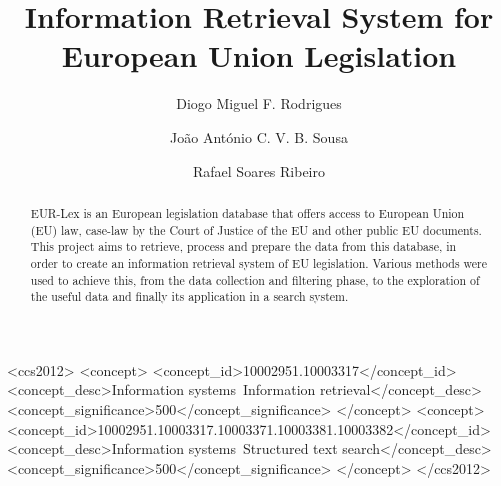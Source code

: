 \documentclass[sigconf, authorversion]{acmart}
\begin{document}
\title{Information Retrieval System for European Union Legislation}

\author{Diogo Miguel F. Rodrigues}

\author{João António C. V. B. Sousa}

\author{Rafael Soares Ribeiro}

\renewcommand{\shortauthors}{Rodrigues, Sousa and Ribeiro}

\begin{abstract}
    EUR-Lex is an European legislation database that offers access to European Union (EU) law,
    case-law by the Court of Justice of the EU and other public EU documents.
    This project aims to retrieve, process and prepare the data from this database, in order to create an information retrieval system of EU legislation.
    Various methods were used to achieve this, from the data collection and filtering phase, to the exploration of the useful data and finally its application in a search system.
\end{abstract}

\begin{CCSXML}
<ccs2012>
<concept>
<concept_id>10002951.10003317</concept_id>
<concept_desc>Information systems~Information retrieval</concept_desc>
<concept_significance>500</concept_significance>
</concept>
<concept>
<concept_id>10002951.10003317.10003371.10003381.10003382</concept_id>
<concept_desc>Information systems~Structured text search</concept_desc>
<concept_significance>500</concept_significance>
</concept>
</ccs2012>
\end{CCSXML}


\end{document}
